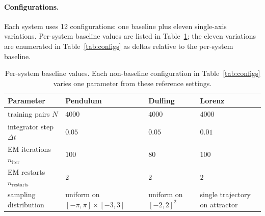 \documentclass{article}
\begin{document}
\paragraph{Configurations.} Each system uses 12 configurations: one baseline plus eleven single-axis variations. Per-system baseline values are listed in Table~\ref{tab:baselines}; the eleven variations are enumerated in Table~\ref{tab:configs} as deltas relative to the per-system baseline.

\begin{table}[H]
\centering\footnotesize
\caption{Per-system baseline values. Each non-baseline configuration in Table~\ref{tab:configs} varies one parameter from these reference settings.}
\label{tab:baselines}
\begin{tabular}{l l l l}
\toprule
Parameter                          & Pendulum                              & Duffing                    & Lorenz \\
\midrule
training pairs $N$                 & $4000$                                & $4000$                     & $4000$ \\
integrator step $\Delta t$         & $0.05$                                & $0.05$                     & $0.01$ \\
EM iterations $n_{\text{iter}}$    & $100$                                 & $80$                       & $100$ \\
EM restarts $n_{\text{restarts}}$  & $2$                                   & $2$                        & $2$ \\
sampling distribution              & uniform on $[-\pi,\pi]\times[-3,3]$  & uniform on $[-2,2]^2$      & single trajectory on attractor \\
\bottomrule
\end{tabular}
\end{table}
\end{document}
